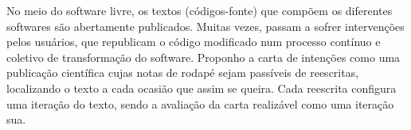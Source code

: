 No meio do software livre, os textos (códigos-fonte) que compõem os diferentes softwares são abertamente publicados. Muitas vezes, passam a sofrer intervenções pelos usuários, que republicam o código modificado num processo contínuo e coletivo de transformação do software. Proponho a carta de intenções como uma publicação científica cujas notas de rodapé sejam passíveis de reescritas, localizando o texto a cada ocasião que assim se queira. Cada reescrita configura uma iteração do texto, sendo a avaliação da carta realizável como uma iteração sua.